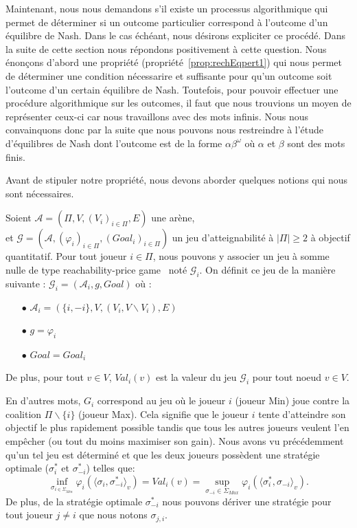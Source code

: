 Maintenant, nous nous demandons s'il existe un processus algorithmique qui permet de déterminer si un outcome particulier correspond à l'outcome d'un équilibre de Nash. Dans le cas échéant, nous désirons expliciter ce procédé. Dans la suite de cette section nous répondons positivement à cette question. Nous énonçons d'abord une propriété (propriété~\ref{prop:rechEqpert1}) qui nous permet de déterminer une condition nécessarire et suffisante pour qu'un outcome soit l'outcome d'un certain équilibre de Nash. Toutefois, pour pouvoir effectuer une procédure algorithmique sur les outcomes, il faut que nous trouvions un moyen de représenter ceux-ci car nous travaillons avec des mots infinis. Nous nous convainquons donc par la suite que nous pouvons nous restreindre à l'étude d'équilibres de Nash dont l'outcome est de la forme $\alpha \beta^{\omega}$ où $\alpha$ et $\beta$ sont des mots finis. 

Avant de stipuler notre propriété, nous devons aborder quelques notions qui nous sont nécessaires.


\begin{defi}
	\label{defi:coalGame}
 Soient $\mathcal{A} = (\Pi, V, (V_{i})_{i\in\Pi}, E)$ une arène,\\
et $\mathcal{G} = (\mathcal{A}, (\varphi _{i})_{i\in\Pi}, (Goal_{i})_{i\in\Pi})$ un jeu d'atteignabilité à $|\Pi| \geq 2$ à objectif quantitatif.
Pour tout joueur $i \in \Pi$, nous pouvons y associer un jeu à somme nulle de type \og reachability-price game \fg~noté $\mathcal{G}_{i}$.
On définit ce jeu de la manière suivante : 
$ \displaystyle \mathcal{G}_{i}= (\mathcal{A}_{i}, g , Goal) \text{ où }$:
\begin{itemize}
	\item[$\bullet$] $\mathcal{A}_{i} = (\{i,-i \}, V, (V_{i},V\backslash V_i),E)$
	\item[$\bullet$] $g = \varphi_i$ 
	\item[$\bullet$] $Goal = Goal_i$
\end{itemize}

\noindent De plus, pour tout $v\in V$, $Val_i(v)$ est la valeur du jeu $\mathcal{G}_i$ pour tout noeud $v\in V$. 
\end{defi} 

En d'autres mots, $G_i$ correspond au jeu où le joueur $i$ (joueur Min) joue contre la coalition $\Pi\backslash\{ i \}$ (joueur Max). Cela signifie que le joueur $i$ tente d'atteindre son objectif le plus rapidement possible tandis que tous les autres joueurs veulent l'en empêcher (ou tout du moins maximiser son gain). Nous avons vu précédemment qu'un tel jeu est déterminé et que les deux joueurs possèdent une stratégie optimale ($\sigma^*_i$ et $\sigma^*_{-i}$) telles que:
$$ \inf_{\sigma _{i\in \Sigma _{Min}}} \varphi_i(\langle \sigma_i,\sigma^*_{-i}\rangle_v)= Val_i(v) = \sup _{\sigma_{-i}\in \Sigma_{Max}} \varphi_i(\langle \sigma^*_i, \sigma_{-i}\rangle_v).$$ De plus, de la stratégie optimale $\sigma^*_{-i}$ nous pouvons dériver une stratégie pour tout joueur $j \neq i$ que nous notons $\sigma_{j,i}$.\\

